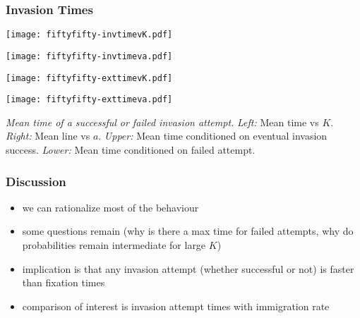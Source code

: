 \documentclass{beamer}
\begin{document}
\begin{frame}
\frametitle{Invasion Times}
\centering
\begin{minipage}[b]{0.475\textwidth}
\centering
\texttt{[image: fiftyfifty-invtimevK.pdf]}
\end{minipage}
\hfill
\begin{minipage}[b]{0.475\textwidth}  
\centering 
\texttt{[image: fiftyfifty-invtimeva.pdf]}
\end{minipage}
\begin{minipage}[b]{0.475\textwidth}   
\centering 
\texttt{[image: fiftyfifty-exttimevK.pdf]}
\end{minipage}
\quad
\begin{minipage}[b]{0.475\textwidth}   
\centering
\texttt{[image: fiftyfifty-exttimeva.pdf]}
\end{minipage}
\justifying
\tiny{
\emph{Mean time of a successful or failed invasion attempt.}
\emph{Left:} Mean time vs $K$. 
\emph{Right:} Mean line vs $a$. 
\emph{Upper:} Mean time conditioned on eventual invasion success. 
\emph{Lower:} Mean time conditioned on failed attempt. 
}
\end{frame}


\begin{frame}
\frametitle{Discussion}
\begin{itemize}
\item we can rationalize most of the behaviour
\item some questions remain (why is there a max time for failed attempts, why do probabilities remain intermediate for large $K$)
\item implication is that any invasion attempt (whether successful or not) is faster than fixation times
\item comparison of interest is invasion attempt times with immigration rate
\end{itemize}
\end{frame}
\end{document}
